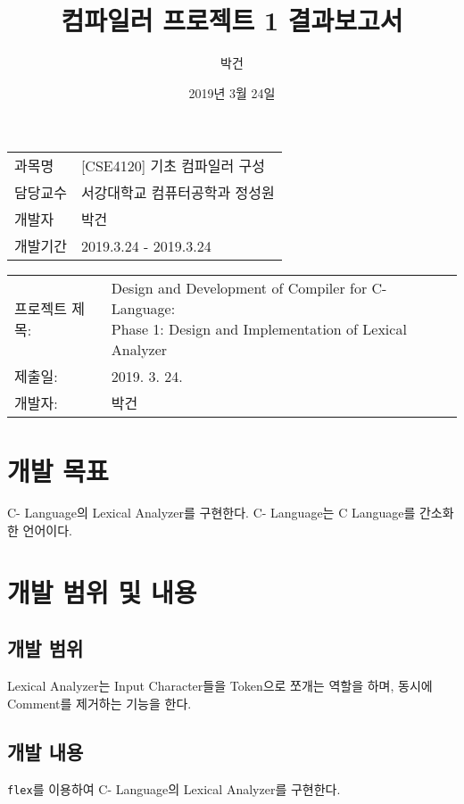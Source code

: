 \documentclass[a4paper, 10pt]{oblivoir}
\title{컴파일러 프로젝트 1 결과보고서}
\author{박건}
\date{2019년 3월 24일}
\begin{document}
\maketitle

\vspace*{\fill}

\begin{center}
\begin{tabular}{ l l }
과목명 & [CSE4120] 기초 컴파일러 구성 \\
담당교수 & 서강대학교 컴퓨터공학과 정성원 \\
개발자 & 박건 \\
개발기간 & 2019.3.24 - 2019.3.24 \\
\end{tabular}
\end{center}

\vspace*{\fill}

\pagebreak

\begin{tabular}{ l l }
프로젝트 제목: & \makecell{Design and Development of Compiler for C- Language: \\
Phase 1: Design and Implementation of Lexical Analyzer} \\
제출일: & 2019. 3. 24.\\
개발자: & 박건 \\
\end{tabular}

\section{개발 목표}
C- Language의 Lexical Analyzer를 구현한다. C- Language는 C Language를 간소화한 언어이다.

\section{개발 범위 및 내용}
\subsection{개발 범위}
Lexical Analyzer는 Input Character들을 Token으로 쪼개는 역할을 하며, 동시에 Comment를 제거하는 기능을 한다.

\subsection{개발 내용}
\texttt{flex}를 이용하여 C- Language의 Lexical Analyzer를 구현한다.
\end{document}
